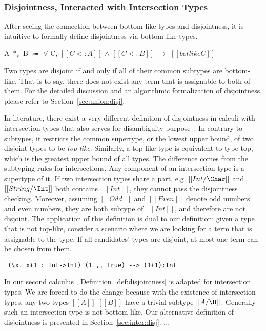 \subsubsection*{Disjointness, Interacted with Intersection Types}
After seeing the connection between bottom-like types and disjointness,
it is intuitive to formally define disjointness via bottom-like types.

\begin{definition}\label{def:disjointness}
	A $*_s$ B $\Coloneqq$ $\forall$ C, $[[C <: A]]$ $\wedge$ $[[C <: B]]$ $\rightarrow$ $[[botlike C]]$
	\label{def:union:disj}
\end{definition}


Two types are disjoint if and only if all of their common subtypes are bottom-like.
That is to say, there does not exist any term that is assignable to both of
them.
For the detailed discussion and an algorithmic formalization of
disjointness, please refer to Section~\ref{sec:union:disj}.

In literature, there exist a very different definition of disjointness
in calculi with intersection types that also serves for disambiguity
purpose~\cite{oliveira2016disjoint}.
In contrary to subtypes, it restricts the common supertype, or the lowest
upper bound, of two disjoint types to be \emph{top-like}.
Similarly, a top-like type is equivalent to type top, which is the greatest
upper bound of all types.
The difference comes from the subtyping rules for intersections.
Any component of an intersection type is a supertype of it.
If two intersection types share a part, e.g. $[[Int/\Char]]$ and $[[String/\Int]]$
both contains $[[Int]]$, they cannot pass the disjointness checking.
Moreover, assuming $[[Odd]]$ and $[[Even]]$ denote odd numbers and even numbers,
they are both subtype of $[[Int]]$, and therefore are not disjoint.
The application of this definition is dual to our definition:
given a type that is not top-like, consider a scenario where we are looking for
a term that is assignable to the type. If all candidates' types are disjoint, 
at most one term can be chosen from them.
\begin{verbatim}
 (\x. x+1 : Int->Int) (1 ,, True) --> (1+1):Int
\end{verbatim}


In our second calculus , Definition~\ref{def:disjointness} is adapted
for intersection types.
We are forced to do the change because with the existence of intersection types,
any two types $[[A]]$ $[[B]]$ have a trivial subtype $[[A/\B]]$. Generally such an intersection type is not bottom-like.
Our alternative definition of disjointness is presented in Section~\ref{sec:inter:disj}.
...


